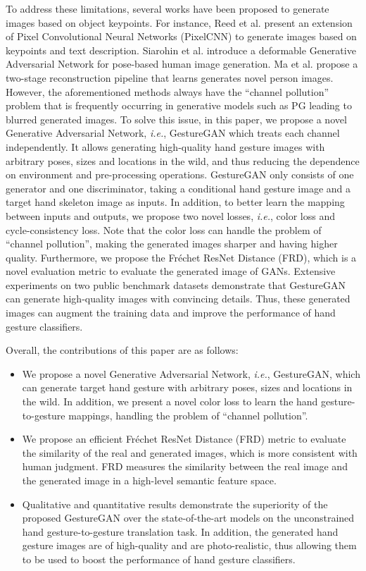 \documentclass[sigconf]{acmart}
\begin{document}
To address these limitations, several works have been proposed to generate images based on object keypoints.
For instance, 
Reed et al. \cite{reed2016generating} present an extension of Pixel Convolutional Neural Networks (PixelCNN) to generate images based on keypoints and text description.
Siarohin et al. \cite{siarohin2017deformable} introduce a deformable Generative Adversarial Network for pose-based human image generation.
Ma et al. \cite{ma2017disentangled} propose a two-stage reconstruction pipeline that learns generates novel person images.
However, the aforementioned methods always have the ``channel pollution'' problem that is frequently occurring in generative models such as PG \cite{ma2017pose} leading to blurred generated images.
To solve this issue, in this paper, we propose a novel Generative Adversarial Network, \textit{i.e.}, GestureGAN which treats each channel independently.
It allows generating high-quality hand gesture images with arbitrary poses, sizes and locations in the wild, and thus reducing the dependence on environment and pre-processing operations. 
GestureGAN only consists of one generator and one discriminator, taking  a conditional hand gesture image and a target hand skeleton image as inputs.
In addition, to better learn the mapping between inputs and outputs, we propose two novel losses, \textit{i.e.}, color loss and cycle-consistency loss.
Note that the color loss can handle the problem of ``channel pollution'', 
making the generated images sharper and having higher quality.
Furthermore, we propose the Fr\'echet ResNet Distance (FRD), which is a novel evaluation metric to evaluate the generated image of GANs.
Extensive experiments on two public benchmark datasets demonstrate that GestureGAN can generate high-quality images with convincing details. 
Thus, these generated images can augment the training data and improve the performance of  hand gesture classifiers.

Overall, the contributions of this paper are as follows:
\begin{itemize}[leftmargin=*]
	\item We propose a novel Generative Adversarial Network, \textit{i.e.}, GestureGAN,  which can generate target hand gesture with arbitrary poses, sizes and locations in the wild. In addition, we present a novel color loss to learn the hand gesture-to-gesture mappings, handling the problem of ``channel pollution''.
	\item We propose an efficient Fr\'echet ResNet Distance (FRD) metric to evaluate the similarity of the real and generated images, which is more consistent with human judgment.
	FRD measures the similarity between the real image and the generated image in a high-level semantic feature space.
	\item  Qualitative and quantitative results demonstrate the superiority of the proposed GestureGAN over the state-of-the-art models on the unconstrained hand gesture-to-gesture translation task. In addition, the generated hand gesture images are of high-quality and are photo-realistic, thus allowing them to be used to boost the performance of hand gesture classifiers.
\end{itemize}
\end{document}
